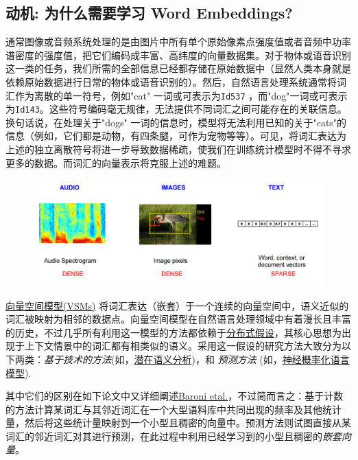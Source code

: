 \subsection{动机: 为什么需要学习 Word Embeddings?}\label{ux52a8}

通常图像或音频系统处理的是由图片中所有单个原始像素点强度值或者音频中功率谱密度的强度值，把它们编码成丰富、高纬度的向量数据集。对于物体或语音识别这一类的任务，我们所需的全部信息已经都存储在原始数据中（显然人类本身就是依赖原始数据进行日常的物体或语音识别的）。然后，自然语言处理系统通常将词汇作为离散的单一符号，例如"cat" 一词或可表示为\lstinline{Id537} ，而"dog"一词或可表示为\lstinline{Id143}。这些符号编码毫无规律，无法提供不同词汇之间可能存在的关联信息。换句话说，在处理关于"dogs" 一词的信息时，模型将无法利用已知的关于"cats"的信息（例如，它们都是动物，有四条腿，可作为宠物等等）。可见，将词汇表达为上述的独立离散符号将进一步导致数据稀疏，使我们在训练统计模型时不得不寻求更多的数据。而词汇的向量表示将克服上述的难题。

\begin{figure}[htbp]
\centering
\includegraphics[width=.9\textwidth]{../SOURCE/images/audio-image-text.png}
\caption{}
\end{figure}

\href{https://en.wikipedia.org/wiki/Vector_space_model}{向量空间模型(VSMs)}
将词汇表达（嵌套）于一个连续的向量空间中，语义近似的词汇被映射为相邻的数据点。向量空间模型在自然语言处理领域中有着漫长且丰富的历史，不过几乎所有利用这一模型的方法都依赖于\href{https://en.wikipedia.org/wiki/Distributional_semantics\#Distributional_Hypothesis}{分布式假设}，其核心思想为出现于上下文情景中的词汇都有相类似的语义。采用这一假设的研究方法大致分为以下两类：\emph{基于技术的方法}(如，\href{https://en.wikipedia.org/wiki/Latent_semantic_analysis}{潜在语义分析})，和 \emph{预测方法} (如，\href{http://www.scholarpedia.org/article/Neural_net_language_models}{神经概率化语言模型}).

其中它们的区别在如下论文中又详细阐述\href{http://clic.cimec.unitn.it/marco/publications/acl2014/baroni-etal-countpredict-acl2014.pdf}{Baroni
etal.}，不过简而言之：基于计数的方法计算某词汇与其邻近词汇在一个大型语料库中共同出现的频率及其他统计量，然后将这些统计量映射到一个小型且稠密的向量中。预测方法则试图直接从某词汇的邻近词汇对其进行预测，在此过程中利用已经学习到的小型且稠密的\emph{嵌套向量}。

